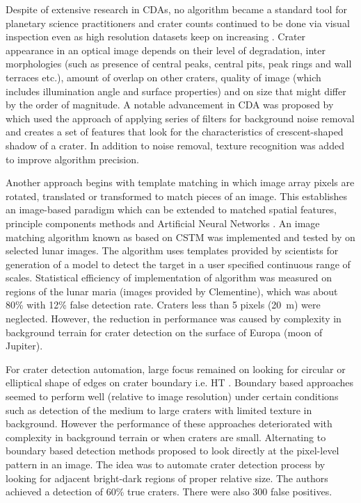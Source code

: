 \documentclass[11pt]{article}
\begin{document}
Despite of extensive research in CDAs, no algorithm became a standard tool for planetary science practitioners and crater counts continued to be done via visual inspection even as high resolution datasets keep on increasing \cite{bandeira2010automatic}. Crater appearance in an optical image depends on their level of degradation, inter morphologies (such as presence of central peaks, central pits, peak rings and wall terraces etc.), amount of overlap on other craters, quality of image (which includes illumination angle and surface properties) and on size that might differ by the order of magnitude. A notable advancement in CDA was proposed by \cite{bandeira2010automatic} which used the approach of applying series of filters for background noise removal and creates a set of features that look for the characteristics of crescent-shaped shadow of a crater. In addition to noise removal, texture recognition was added to improve algorithm precision.

Another approach begins with template matching in which image array pixels are rotated, translated or transformed to match pieces of an image. This establishes an image-based paradigm which can be extended to matched spatial features, principle components methods and Artificial Neural Networks \cite{brunelli1993face}. An image matching algorithm known as based on CSTM was implemented and tested by \cite{burl2001automated} on selected lunar images. The algorithm uses templates provided by scientists for generation of a model to detect the target in a user specified continuous range of scales. Statistical efficiency of implementation of algorithm was measured on regions of the lunar maria (images provided by Clementine), which was about 80\% with 12\% false detection rate. Craters less than 5 pixels (\SI{20}{m}) were neglected. However, the reduction in performance was caused by complexity in background terrain for crater detection on the surface of Europa (moon of Jupiter).

For crater detection automation, large focus remained on looking for circular or elliptical shape of edges on crater boundary i.e. HT \cite{honda2000crater}.  Boundary based approaches seemed to perform well (relative to image resolution) under certain conditions such as detection of the medium to large craters with limited texture in background. However the performance of these approaches deteriorated with complexity in background terrain or when craters are small. Alternating to boundary based detection methods \cite{wetzler2005learning} proposed to look directly at the pixel-level pattern in an image. The idea was to automate crater detection process by looking for adjacent bright-dark regions of proper relative size. The authors achieved a detection of 60\% true craters. There were also 300 false positives. 
\end{document}
